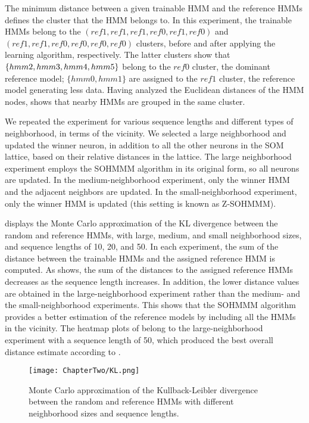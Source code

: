 The minimum distance between a given trainable HMM and the reference HMMs defines the cluster that the HMM belongs to. In this experiment, the trainable HMMs belong to the $(ref1,ref1,ref1,ref0,ref1,ref0)$ and $(ref1,ref1,ref0,ref0,ref0,ref0)$ clusters, before and after applying the learning algorithm, respectively. The latter clusters show that $\{hmm2,hmm3,hmm4\-,hmm5\}$ belong to the $ref0$ cluster, the dominant reference model; $\{hmm0,hmm1\}$ are assigned to the $ref1$ cluster, the reference model generating less data. Having analyzed the Euclidean distances of the HMM nodes,  shows that nearby HMMs are grouped in the same cluster.

We repeated the experiment for various sequence lengths and different types of neighborhood, in terms of the vicinity. We selected a large neighborhood and updated the winner neuron, in addition to all the other neurons in the SOM lattice, based on their relative distances in the lattice. The large neighborhood experiment employs the SOHMMM algorithm in its original form, so all neurons are updated. In the medium-neighborhood experiment, only the winner HMM and the adjacent neighbors are updated. In the small-neighborhood experiment, only the winner HMM is updated (this setting is known as Z-SOHMMM).

 displays the Monte Carlo approximation of the KL divergence between the random and reference HMMs, with large, medium, and small neighborhood sizes, and sequence lengths of 10, 20, and 50. In each experiment, the sum of the distance between the trainable HMMs and the assigned reference HMM is computed. As  shows, the sum of the distances to the assigned reference HMMs decreases as the sequence length increases. In addition, the lower distance values are obtained in the large-neighborhood experiment rather than the medium- and the small-neighborhood experiments. This shows that the SOHMMM algorithm provides a better estimation of the reference models by including all the HMMs in the vicinity. The heatmap plots of  belong to the large-neighborhood experiment with a sequence length of 50, which produced the best overall distance estimate according to .

\begin{figure}[h]
    \centering
    \texttt{[image: ChapterTwo/KL.png]}
    \caption{Monte Carlo approximation of the Kullback-Leibler divergence between the random and reference HMMs with different neighborhood sizes and sequence lengths.}
    \label{fig:sohmmm_dist_neig}
\end{figure}

